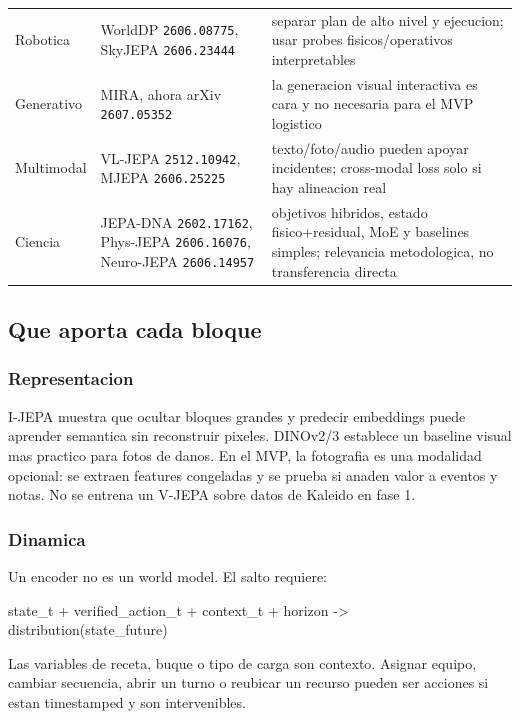 \documentclass[
  spanish,
  10pt,
  a4paper,
]{article}
\newenvironment{Shaded}{}{}
\newcommand{\NormalTok}[1]{#1}
\begin{document}
{\begin{longtable}[]{@{}lll@{}}
Robotica & WorldDP \texttt{2606.08775}, SkyJEPA \texttt{2606.23444} &
separar plan de alto nivel y ejecucion; usar probes fisicos/operativos
interpretables \\
Generativo & MIRA, ahora arXiv \texttt{2607.05352} & la generacion
visual interactiva es cara y no necesaria para el MVP logistico \\
Multimodal & VL-JEPA \texttt{2512.10942}, MJEPA \texttt{2606.25225} &
texto/foto/audio pueden apoyar incidentes; cross-modal loss solo si hay
alineacion real \\
Ciencia & JEPA-DNA \texttt{2602.17162}, Phys-JEPA \texttt{2606.16076},
Neuro-JEPA \texttt{2606.14957} & objetivos hibridos, estado
fisico+residual, MoE y baselines simples; relevancia metodologica, no
transferencia directa \\
\end{longtable}
}

\subsection{Que aporta cada bloque}\label{que-aporta-cada-bloque}

\subsubsection{Representacion}\label{representacion}

I-JEPA muestra que ocultar bloques grandes y predecir embeddings puede
aprender semantica sin reconstruir pixeles. DINOv2/3 establece un
baseline visual mas practico para fotos de danos. En el MVP, la
fotografia es una modalidad opcional: se extraen features congeladas y
se prueba si anaden valor a eventos y notas. No se entrena un V-JEPA
sobre datos de Kaleido en fase 1.

\subsubsection{Dinamica}\label{dinamica}

Un encoder no es un world model. El salto requiere:

\begin{Shaded}
\begin{Highlighting}[]
\NormalTok{state\_t + verified\_action\_t + context\_t + horizon {-}\textgreater{} distribution(state\_future)}
\end{Highlighting}
\end{Shaded}

Las variables de receta, buque o tipo de carga son contexto. Asignar
equipo, cambiar secuencia, abrir un turno o reubicar un recurso pueden
ser acciones si estan timestamped y son intervenibles.
\end{document}
